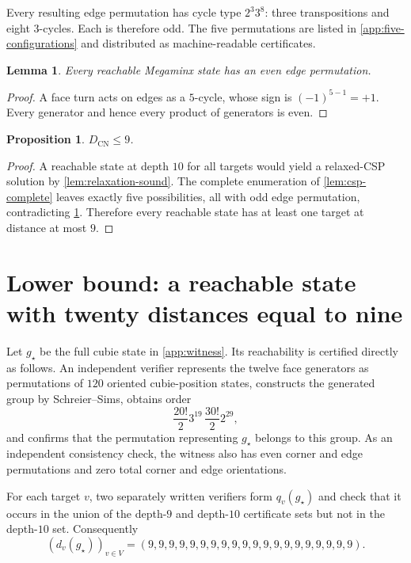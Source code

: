 \documentclass[11pt]{article}
\newtheorem{lemma}[theorem]{Lemma}
\newtheorem{proposition}[theorem]{Proposition}
\theoremstyle{definition}
\newcommand{\DCN}{D_{\mathrm{CN}}}
\begin{document}
Every resulting edge permutation has cycle type $2^3 3^8$: three transpositions and eight $3$-cycles.  Each is therefore odd.  The five permutations are listed in \cref{app:five-configurations} and distributed as machine-readable certificates.

\begin{lemma}\label{lem:edge-parity}
Every reachable Megaminx state has an even edge permutation.
\end{lemma}
\begin{proof}
A face turn acts on edges as a $5$-cycle, whose sign is $(-1)^{5-1}=+1$.  Every generator and hence every product of generators is even.
\end{proof}

\begin{proposition}\label{prop:upper}
$\DCN\le9$.
\end{proposition}
\begin{proof}
A reachable state at depth $10$ for all targets would yield a relaxed-CSP solution by \cref{lem:relaxation-sound}.  The complete enumeration of \cref{lem:csp-complete} leaves exactly five possibilities, all with odd edge permutation, contradicting \cref{lem:edge-parity}.  Therefore every reachable state has at least one target at distance at most $9$.
\end{proof}

\section{Lower bound: a reachable state with twenty distances equal to nine}

Let $g_\star$ be the full cubie state in \cref{app:witness}.  Its reachability is certified directly as follows.  An independent verifier represents the twelve face generators as permutations of $120$ oriented cubie-position states, constructs the generated group by Schreier--Sims, obtains order
\[
\frac{20!}{2}3^{19}\,\frac{30!}{2}2^{29},
\]
and confirms that the permutation representing $g_\star$ belongs to this group.  As an independent consistency check, the witness also has even corner and edge permutations and zero total corner and edge orientations.

For each target $v$, two separately written verifiers form $q_v(g_\star)$ and check that it occurs in the union of the depth-$9$ and depth-$10$ certificate sets but not in the depth-$10$ set.  Consequently
\[
(d_v(g_\star))_{v\in V}=(9,9,9,9,9,9,9,9,9,9,9,9,9,9,9,9,9,9,9,9).
\]
\end{document}
